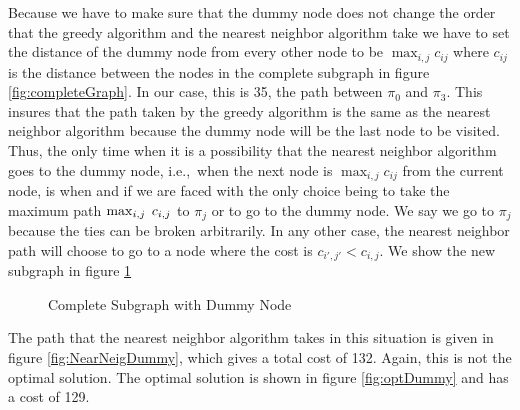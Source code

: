 Because we have to make sure that the dummy node does not change the order that the greedy algorithm and the nearest neighbor algorithm take we have to set the distance of the dummy node from every other node to be $\max_{i,j} c_{ij} $ where $c_{ij}$ is the distance between the nodes in the complete subgraph in figure \ref{fig:completeGraph}. In our case, this is 35, the path between $\pi_0$ and $\pi_3$. This insures that the path taken by the greedy algorithm is the same as the nearest neighbor algorithm because the dummy node will be the last node to be visited. Thus, the only time when it is a possibility that the nearest neighbor algorithm goes to the dummy node, i.e.,\ when the next node is $\max_{i,j} c_{ij}$ from the current node, is when and if we are faced with the only choice being to take the maximum path $ \max_{i,j} \hspace{0.1cm} c_{i,j}$ to $\pi_j$ or to go to the dummy node. We say we go to $\pi_j$ because the ties can be broken arbitrarily. In any other case, the nearest neighbor path will choose to go to a node where the cost is $c_{i',j'} < c_{i,j}$. We show the new subgraph in figure \ref{fig:completeDummy}

\begin{figure}
\centering
{}
\caption{Complete Subgraph with Dummy Node}
\label{fig:completeDummy}
\end{figure}

The path that the nearest neighbor algorithm takes in this situation is given in figure \ref{fig:NearNeigDummy}, which gives a total cost of 132. Again, this is not the optimal solution. The optimal solution is shown in figure \ref{fig:optDummy} and has a cost of 129.

